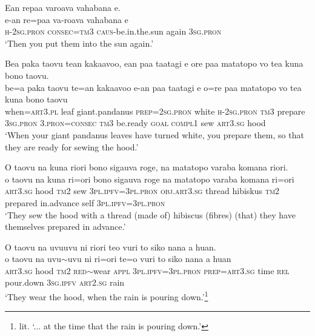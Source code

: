 \ea\label{ex:text10-11}
Ean repaa varoava vahabana e.\\
\gll e-an	re=paa	va-roava	vahabana	e\\
     \textsc{h}-2\textsc{sg}.\textsc{pron}	\textsc{consec}=\textsc{tm}3	\textsc{caus}-be.in.the.sun	again	3\textsc{sg}.\textsc{pron}\\
\glt `Then you put them into the sun again.'
\z

\ea\label{ex:text10-12}
Bea paka taovu tean kakaavoo, ean paa taatagi e ore paa matatopo vo tea kuna bono taovu.\\
\gll be=a	paka	taovu	te=an	kakaavoo	e-an	paa	taatagi	e	o=re	paa	matatopo	vo	tea	kuna	bono	taovu\\
     when=\textsc{art}3.\textsc{pl}	leaf	giant.pandanus	\textsc{prep}=2\textsc{sg}.\textsc{pron}	white	\textsc{h}-2\textsc{sg}.\textsc{pron}	\textsc{tm}3	prepare	3\textsc{sg}.\textsc{pron}	3.\textsc{pron}=\textsc{consec}	\textsc{tm}3	be.ready	\textsc{goal}	\textsc{compl}1	sew	\textsc{art}3.\textsc{sg}	hood\\
\glt `When your giant pandanus leaves have turned white, you prepare them, so that they are ready for sewing the hood.'
\z

\ea\label{ex:text10-13}
O taovu na kuna riori bono sigauva roge, na matatopo varaba komana riori.\\
\gll o	taovu	na	kuna	ri=ori	bono	sigauva	roge	na	matatopo	varaba	komana	ri=ori\\
     \textsc{art}3.\textsc{sg}	hood	\textsc{tm}2	sew	3\textsc{pl}.\textsc{ipfv}=3\textsc{pl}.\textsc{pron}	\textsc{obj}.\textsc{art}3.\textsc{sg}	thread	hibiskus	\textsc{tm}2	prepared	in.advance	self	3\textsc{pl}.\textsc{ipfv}=3\textsc{pl}.\textsc{pron}\\
\glt `They sew the hood with a thread (made of)  hibiscus (fibres) (that) they have themselves prepared in advance.'
\z

\ea\label{ex:text10-14}
O taovu na uvuuvu ni riori teo vuri to siko nana a huan.\\
\gll o	taovu	na	uvu{$\sim$}uvu	ni	ri=ori	te=o	vuri	to	siko	nana	a	huan\\
     \textsc{art}3.\textsc{sg}	hood	\textsc{tm}2	\textsc{red}{$\sim$}wear	\textsc{appl}	3\textsc{pl}.\textsc{ipfv}=3\textsc{pl}.\textsc{pron}	\textsc{prep}=\textsc{art}3.\textsc{sg}	time	\textsc{rel}	pour.down	3\textsc{sg}.\textsc{ipfv}	\textsc{art}2.\textsc{sg}	rain\\
\glt `They wear the hood, when the rain is pouring down.'\footnote{lit. `... at the time that the rain is pouring down.'}
\z